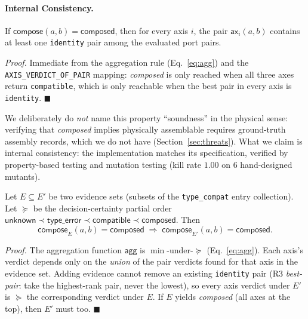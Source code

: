 \documentclass[11pt,twocolumn]{article}
\begin{document}
\paragraph{Internal Consistency.}
\begin{definition}
If $\mathsf{compose}(a, b) = \mathsf{composed}$, then for every
axis $i$, the pair $\mathsf{ax}_i(a, b)$ contains at least one
\texttt{identity} pair among the evaluated port pairs.
\end{definition}

\emph{Proof.} Immediate from the aggregation rule (Eq.~\ref{eq:agg})
and the \texttt{AXIS\_VERDICT\_OF\_PAIR} mapping: \emph{composed}
is only reached when all three axes return \texttt{compatible},
which is only reachable when the best pair in every axis is
\texttt{identity}. $\blacksquare$

We deliberately do \emph{not} name this property ``soundness'' in
the physical sense: verifying that \emph{composed} implies physically
assemblable requires ground-truth assembly records, which we do
not have (Section~\ref{sec:threats}). What we claim is internal
consistency: the implementation matches its specification, verified
by property-based testing and mutation testing (kill rate $1.00$
on $6$ hand-designed mutants).

\begin{theorem}
\label{thm:monotonicity}
Let $E \subseteq E'$ be two evidence sets (subsets of the
\texttt{type\_compat} entry collection). Let $\succeq$ be the
decision-certainty partial order
$\mathsf{unknown} \prec \mathsf{type\_error} \prec
\mathsf{compatible} \prec \mathsf{composed}$. Then
\begin{equation}
  \mathsf{compose}_E(a, b) = \mathsf{composed}
  \;\Longrightarrow\;
  \mathsf{compose}_{E'}(a, b) = \mathsf{composed}.
\end{equation}
\end{theorem}

\emph{Proof.} The aggregation function $\mathsf{agg}$ is
$\min$-under-$\succeq$ (Eq.~\ref{eq:agg}). Each axis's verdict
depends only on the \emph{union} of the pair verdicts found for
that axis in the evidence set. Adding evidence cannot remove an
existing \texttt{identity} pair (R3 \emph{best-pair}: take the
highest-rank pair, never the lowest), so every axis verdict under
$E'$ is $\succeq$ the corresponding verdict under $E$. If $E$
yields \emph{composed} (all axes at the top), then $E'$ must too.
$\blacksquare$
\end{document}
